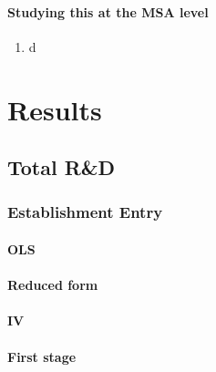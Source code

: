 \documentclass[7pt,english]{article}
\theoremstyle{remark}
\begin{document}
\paragraph{Studying this at the MSA level}
\begin{enumerate}
	\item d
\end{enumerate}

\newpage
\section{Results}

\subsection{Total R\&D}


\subsubsection{Establishment Entry}

\paragraph{OLS}
\begin{table}[h]
	
\end{table}

\newpage
\paragraph{Reduced form}
\begin{table}[h]
	
\end{table}

\paragraph{IV}
\begin{table}[h]
	
\end{table}

\paragraph{First stage}
\begin{table}[h]
	
\end{table}
\end{document}
